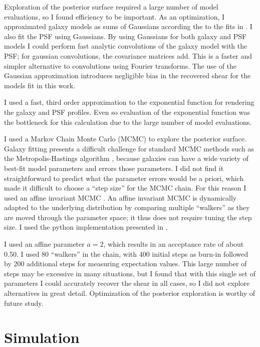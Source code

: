 \documentclass[12pt,preprint]{aastex}
\begin{document}
Exploration of the posterior surface required a large number of model
evaluations, so I found efficiency to be important.  As an optimization, I
approximated galaxy models as sums of Gaussians according the to the fits in
\citet{HoggGMix}.  I also fit the PSF using Gaussians.  By using Gaussians for
both galaxy and PSF models I could perform fast analytic convolutions of the
galaxy model with the PSF; for gaussian convolutions, the covariance matrices
add.  This is a faster and simpler alternative to convolutions using Fourier
transforms. The use of the Gaussian approximation introduces negligible bias in
the recovered shear for the models fit in this work.

I used a fast, third order approximation to the exponential function for
rendering the galaxy and PSF profiles.  Even so evaluation of the exponential
function was the bottleneck for this calculation due to the large number
of model evaluations.

I used a Markov Chain Monte Carlo (MCMC) to explore the posterior surface.
Galaxy fitting presents a difficult challenge for standard MCMC methods such as
the Metropolis-Hastings algorithm \citep{Metropolis53}, because galaxies can
have a wide variety of best-fit model parameters and errors those parameters.
I did not find it straightforward to predict what the parameter errors would be
a priori, which made it difficult to choose a ``step size'' for the MCMC chain.
For this reason I used an affine invariant MCMC \citet{GoodmanWeare10}.  An
affine invariant MCMC is dynamically adapted to the underlying distribution by
comparing multiple ``walkers'' as they are moved through the parameter space;
it thus does not require tuning the step size.  I used the python
implementation presented in \citet{Mackey13}.

I used an affine parameter $a=2$, which results in an acceptance rate of about
0.50. I used 80 ``walkers'' in the chain, with 400 initial steps as burn-in
followed by 200 additional steps for measuring expectation values.  This large
number of steps may be excessive in many situations, but I found that with this
single set of parameters I could accurately recover the shear in all cases, so
I did not explore alternatives in great detail.  Optimization of the posterior
exploration is worthy of future study.


\section{Simulation} \label{sec:sim}
\end{document}
